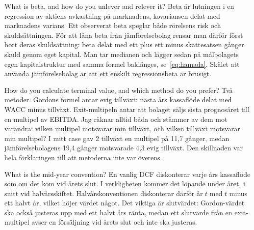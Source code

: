\begin{fraga}{What is beta, and how do you unlever and relever it?}
Beta är lutningen i en regression av aktiens avkastning på marknadens, kovariansen delat med
marknadens varians. Ett observerat beta speglar både rörelsens risk och skuldsättningen. För
att låna beta från jämförelsebolag rensar man därför först bort deras skuldsättning: beta delat
med ett plus ett minus skattesatsen gånger skuld genom eget kapital. Man tar medianen och
lägger sedan på målbolagets egen kapitalstruktur med samma formel baklänges,
se~\eqref{eq:hamada}. Skälet att använda jämförelsebolag är att ett enskilt regressionsbeta är
brusigt.
\end{fraga}

\begin{fraga}{How do you calculate terminal value, and which method do you prefer?}
Två metoder. Gordons formel antar evig tillväxt: nästa års kassaflöde delat med WACC minus
tillväxt. Exit-multipeln antar att bolaget säljs sista prognosåret till en multipel av EBITDA.
Jag räknar alltid båda och stämmer av dem mot varandra: vilken multipel motsvarar min tillväxt,
och vilken tillväxt motsvarar min multipel? I mitt case gav 2\pct{} tillväxt en multipel på
11,7 gånger, medan jämförelsebolagens 19,4 gånger motsvarade 4,3\pct{} evig tillväxt. Den
skillnaden var hela förklaringen till att metoderna inte var överens.
\end{fraga}

\begin{fraga}{What is the mid-year convention?}
En vanlig DCF diskonterar varje års kassaflöde som om det kom vid årets slut. I verkligheten
kommer det löpande under året, i snitt vid halvårsskiftet. Halvårskonventionen diskonterar
därför år $t$ med $t$ minus ett halvt år, vilket höjer värdet något. Det viktiga är
slutvärdet: Gordon-värdet ska också justeras upp med ett halvt års ränta, medan ett slutvärde
från en exit-multipel avser en försäljning vid årets slut och inte ska justeras.
\end{fraga}

